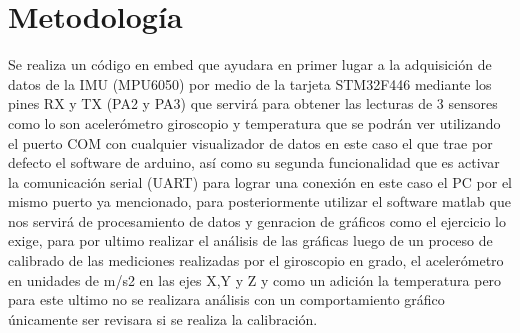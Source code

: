 \section{Metodología} \label{sec:metodologia}

Se realiza un código en embed que ayudara en primer lugar a la adquisición de datos de la IMU (MPU6050) por medio de la tarjeta STM32F446 mediante los pines RX y TX (PA2 y PA3) que servirá para obtener las lecturas de 3 sensores como lo son acelerómetro giroscopio y temperatura que se podrán ver utilizando el puerto COM con cualquier visualizador de datos en este caso el que trae por defecto el software de arduino, así como su segunda funcionalidad que es activar la comunicación serial (UART) para lograr una conexión en este caso el PC por el mismo puerto ya mencionado, para posteriormente utilizar el software matlab que nos servirá de procesamiento de datos y genracion de gráficos \cite{elizondo2002matlab} como el ejercicio lo exige, para por ultimo realizar el análisis de las gráficas luego de un proceso de calibrado \cite{wolf1992precision} de las mediciones realizadas por el giroscopio en grado, el acelerómetro en unidades de m/s2 en las ejes X,Y y Z y como un adición la temperatura pero para este ultimo no se realizara análisis con un comportamiento gráfico únicamente ser revisara si se realiza la calibración.
